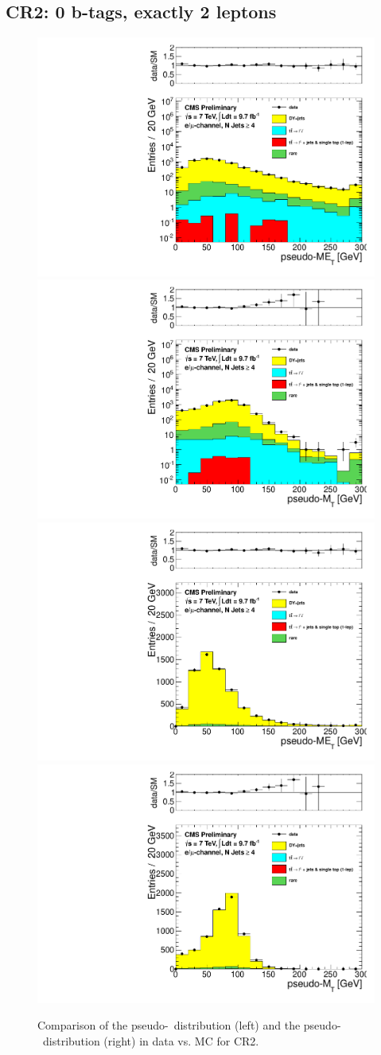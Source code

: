 \clearpage

 \subsection {CR2: 0 b-tags, exactly 2 leptons}

 \begin{figure}[hbt]
   \begin{center}
     \includegraphics[width=0.5\linewidth]{plots/pas_log/met_lepcor_scaled_nj4_emucomb_CR2.pdf}%
     \includegraphics[width=0.5\linewidth]{plots/pas_log/mt_lepcor_scaled_nj4_emucomb_CR2.pdf}
     \includegraphics[width=0.5\linewidth]{plots/pas_lin/met_lepcor_scaled_nj4_emucomb_CR2.pdf}%
     \includegraphics[width=0.5\linewidth]{plots/pas_lin/mt_lepcor_scaled_nj4_emucomb_CR2.pdf}
     \caption{
       Comparison of the pseudo-\met\ distribution (left) and the pseudo-\mt\ distribution (right)
       in data vs. MC for CR2.
       \label{fig:cr2met} 
     }  
   \end{center}
 \end{figure}
  
 \clearpage



